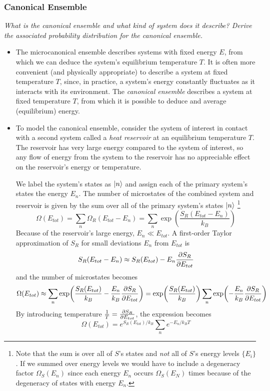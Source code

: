 \documentclass[11pt, a4paper]{article}
\begin{document}
\subsubsection{Canonical Ensemble}
\textit{What is the canonical ensemble and what kind of system does it describe?  Derive the associated probability distribution for the canonical ensemble.}
\begin{itemize}
	\item The microcanonical ensemble describes systems with fixed energy $ E $, from which we can deduce the system's equilibrium temperature $ T $. It is often more convenient (and physically appropriate) to describe a system at fixed temperature $ T $, since, in practice, a system's energy constantly fluctuates as it interacts with its environment. The \textit{canonical ensemble} describes a system at fixed temperature $ T $, from which it is possible to deduce and average (equilibrium) energy.
	
	\item To model the canonical ensemble, consider the system of interest in contact with a second system called a \textit{heat reservoir} at an equilibrium temperature $ T $. The reservoir has very large energy compared to the system of interest, so any flow of energy from the system to the reservoir has no appreciable effect on the reservoir's energy or temperature. 
	
	We label the system's states as $ \ket{n} $ and assign each of the primary system's states the energy $ E_{n} $. The number of microstates of the combined system and reservoir is given by the sum over all of the primary system's states $ \ket{n} $ \footnote{Note that the sum is over all of $ S $'s states and \textit{not} all of $ S $'s energy levels $ \{E_{i}\} $. If we summed over energy levels we would have to include a degeneracy factor $ \Omega_{S}(E_{n}) $ since each energy $ E_{n} $ occurs $ \Omega_{S}(E_{N}) $ times because of the degeneracy of states with energy $ E_{n} $.}
	\begin{equation*}
		\Omega(E_{tot}) = \sum_{n}\Omega_{R}(E_{tot} - E_{n}) = \sum_{n} \exp(\frac{S_{R}(E_{tot}- E_{n})}{k_{B}})
	\end{equation*}
	Because of the reservoir's large energy, $ E_{n} \ll E_{tot}$. A first-order Taylor approximation of $ S_{R} $ for small deviations $ E_{n} $ from $ E_{tot} $ is
	\begin{equation*}
		S_{R}(E_{tot} - E_{n}) \approx S_{R}(E_{tot}) - E_{n}\pdv{S_{R}}{E_{tot}}
	\end{equation*}
	and the number of microstates becomes
	\begin{equation*}
		\Omega(E_{tot}) \approx \sum_{n} \exp(\frac{S_{R}(E_{tot}) }{k_{B}} - \frac{E_{n}}{k_{B}}\pdv{S_{R}}{E_{tot}}) = \exp(\frac{S_{R}(E_{tot})}{k_{B}}) \sum_{n} \exp(- \frac{E_{n}}{k_{B}}\pdv{S_{R}}{E_{tot}})
	\end{equation*}
	By introducing temperature $ \frac{1}{T} = \pdv{S_{R}}{E_{tot}} $, the expression becomes
	\begin{equation*}
		\Omega(E_{tot}) = e^{S_{R}(E_{tot})/k_{B}} \sum_{n} e^{-E_{n}/k_{B}T}
	\end{equation*}
		

\end{itemize}
\end{document}

